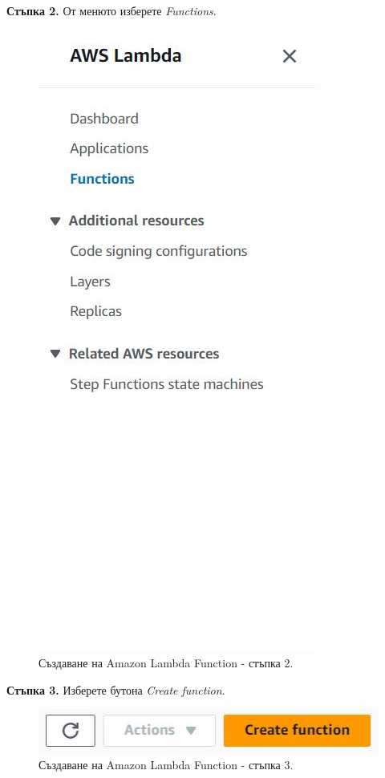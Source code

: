 \documentclass[12pt]{article}
\begin{document}
\noindent\textbf{Стъпка 2.} От менюто изберете \textit{Functions}.
\begin{figure}[h!]
\centering
    \includegraphics[scale=0.55]{instructions/lambda/2.JPG}
  \caption{Създаване на Amazon Lambda Function - стъпка 2.}
\end{figure}

\noindent\textbf{Стъпка 3.} Изберете бутона \textit{Create function}.
\begin{figure}[h!]
\centering
    \includegraphics[scale=0.6]{instructions/lambda/3.JPG}
  \caption{Създаване на Amazon Lambda Function - стъпка 3.}
\end{figure}
\end{document}
